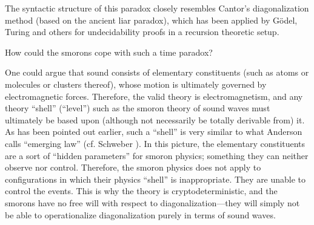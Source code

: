 \documentclass[pra,amsfonts, twocolumn]{revtex4}
\begin{document}
The syntactic structure of this
paradox closely resembles Cantor's  diagonalization method
(based on the ancient liar paradox),
 which has been
applied by G\"odel, Turing and others for undecidability proofs in a
recursion theoretic setup.

How could the {\sc smorons} cope with such a time paradox?


One could argue that sound consists of elementary constituents (such as
atoms or molecules or clusters thereof),  whose motion is ultimately
governed by electromagnetic forces. Therefore, the valid theory is
electromagnetism, and any theory ``shell'' (``level'') such as the
{\sc smoron} theory of sound waves must ultimately be based  upon
(although
not necessarily be totally derivable from) it. As has been pointed out
earlier,
such a ``shell'' is very similar to what Anderson \cite{anderson} calls
``emerging law'' (cf. Schweber \cite{schweber}). In this
picture, the elementary constituents are a sort of ``hidden parameters''
for {\sc smoron} physics; something they can neither observe nor
control.
Therefore, the {\sc smoron} physics does not apply to configurations in
which
their physics ``shell'' is inappropriate. They are unable to control the
events. This is why the theory is cryptodeterministic, and the {\sc smorons}
have no free will with respect to diagonalization---they will simply not
be able to operationalize diagonalization purely in terms of sound
waves.
\end{document}
